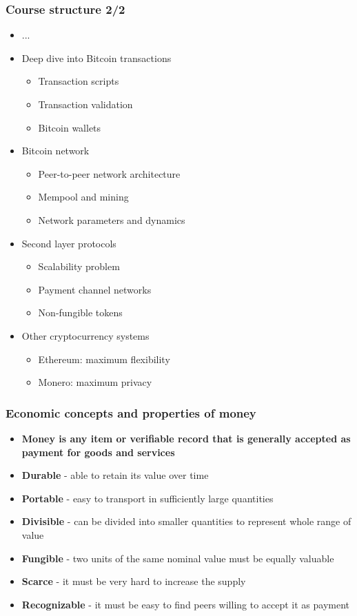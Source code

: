\documentclass{beamer}
\begin{document}
\begin{frame}
  \frametitle{Course structure 2/2}
  \begin{itemize}
  \item[] ...
  \item Deep dive into Bitcoin transactions
    \begin{itemize}
    \item Transaction scripts
    \item Transaction validation
    \item Bitcoin wallets
    \end{itemize}
  \item Bitcoin network
    \begin{itemize}
    \item Peer-to-peer network architecture
    \item Mempool and mining
    \item Network parameters and dynamics
    \end{itemize}
  \item Second layer protocols
    \begin{itemize}
    \item Scalability problem
    \item Payment channel networks
    \item Non-fungible tokens
    \end{itemize}
  \item Other cryptocurrency systems
    \begin{itemize}
    \item Ethereum: maximum flexibility
    \item Monero: maximum privacy
    \end{itemize}
  \end{itemize}
\end{frame}

\begin{frame}
  \frametitle{Economic concepts and properties of money}
  \begin{itemize}
  \item \textbf{Money is any item or verifiable record that is generally accepted as
    payment for goods and services}
  \item \textbf{Durable} - able to retain its value over time
  \item \textbf{Portable} - easy to transport in sufficiently large quantities
  \item \textbf{Divisible} - can be divided into smaller quantities to represent whole
    range of value
  \item \textbf{Fungible} - two units of the same nominal value must be equally valuable
  \item \textbf{Scarce} - it must be very hard to increase the supply
  \item \textbf{Recognizable} - it must be easy to find peers willing to accept
    it as payment
  \end{itemize}
\end{frame}
\end{document}
